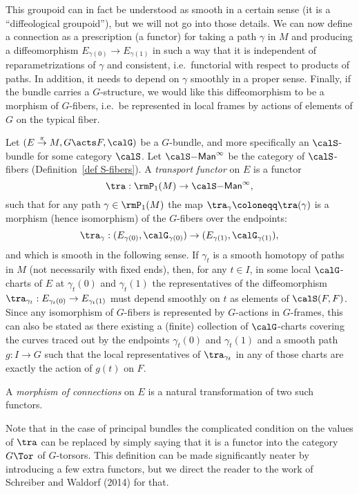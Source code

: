 This groupoid can in fact be understood as smooth in a certain sense (it is a ``diffeological groupoid''), but we will not go into those details. We can now define a connection as a prescription (a functor) for taking a path $\gamma$ in $M$ and producing a diffeomorphism $E_{\gamma(0)}\to E_{\gamma(1)}$ in such a way that it is independent of reparametrizations of $\gamma$ and consistent, i.e.\ functorial with respect to products of paths. In addition, it needs to depend on $\gamma$ smoothly in a proper sense. Finally, if the bundle carries a $G$-structure, we would like this diffeomorphism to be a morphism of $G$-fibers, i.e.\ be represented in local frames by actions of elements of $G$ on the typical fiber.

\begin{defn}
    Let $(E\overset{\pi}{\to}M,G\acts F,\calG)$ be a $G$-bundle, and more specifically an $\calS$-bundle for some category $\calS$. Let $\calS\mathsf{-Man}^\infty$ be the category of $\calS$-fibers (Definition~\ref{def S-fibers}). A \emph{transport functor} on $E$ is a functor
    \[\tra: \rmP_1(M)\to \calS\mathsf{-Man}^\infty,\]
    such that for any path $\gamma\in\rmP_1(M)$ the map $\tra_\gamma\coloneqq \tra(\gamma)$ is a morphism (hence isomorphism) of the $G$-fibers over the endpoints:
    \[\tra_\gamma:(E_{\gamma(0)},\calG_{\gamma(0)})\to (E_{\gamma(1)},\calG_{\gamma(1)}),\]
    and which is smooth in the following sense. If $\gamma_t$ is a smooth homotopy of paths in $M$ (not necessarily with fixed ends), then, for any $t\in I$, in some local $\calG$-charts of $E$ at $\gamma_t(0)$ and $\gamma_t(1)$ the representatives of the diffeomorphism $\tra_{\gamma_t}:E_{\gamma_t(0)}\to E_{\gamma_t(1)}$ must depend smoothly on $t$ as elements of $\calS(F,F)$. Since any isomorphism of $G$-fibers is represented by $G$-actions in $G$-frames, this can also be stated as there existing a (finite) collection of $\calG$-charts covering the curves traced out by the endpoints $\gamma_t(0)$ and $\gamma_t(1)$ and a smooth path $g:I\to G$ such that the local representatives of $\tra_{\gamma_t}$ in any of those charts are exactly the action of $g(t)$ on $F$.

    A \emph{morphism of connections} on $E$ is a natural transformation of two such functors.
\end{defn}

Note that in the case of principal bundles the complicated condition on the values of $\tra$ can be replaced by simply saying that it is a functor into the category $G\Tor$ of $G$-torsors. This definition can be made significantly neater by introducing a few extra functors, but we direct the reader to the work of Schreiber and Waldorf (2014) for that.

